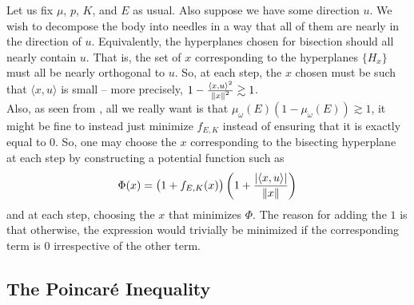 \documentclass{article}
\begin{document}
		Let us fix $\mu$, $p$, $K$, and $E$ as usual. Also suppose we have some direction $u$. We wish to decompose the body into needles in a way that all of them are nearly in the direction of $u$. Equivalently, the hyperplanes chosen for bisection should all nearly contain $u$. That is, the set of $x$ corresponding to the hyperplanes $\{H_x\}$ must all be nearly orthogonal to $u$. So, at each step, the $x$ chosen must be such that $\langle x , u \rangle$ is small -- more precisely, $1 - \frac{\langle x , u \rangle^2}{\left\lVert x\right\rVert^2} \gtrsim 1$.\\
		Also, as seen from , all we really want is that $\mu_\omega(E)(1-\mu_\omega(E)) \gtrsim 1$, it might be fine to instead just minimize $f_{E,K}$ instead of ensuring that it is exactly equal to $0$. So, one may choose the $x$ corresponding to the bisecting hyperplane at each step by constructing a potential function such as
		\[ \Phi(x) = \left(1 + f_{E,K}(x)\right) \left(1 + \frac{|\langle x , u \rangle|}{\left\lVert x\right\rVert}\right) \]
		and at each step, choosing the $x$ that minimizes $\Phi$. The reason for adding the $1$ is that otherwise, the expression would trivially be minimized if the corresponding term is $0$ irrespective of the other term.



	\subsection{The Poincar\'{e} Inequality}
\end{document}
